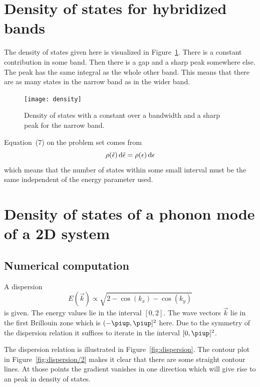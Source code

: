 \documentclass[11pt, english, fleqn, DIV=15, headinclude, BCOR=1cm]{scrartcl}
\begin{document}
\section{Density of states for hybridized bands}
\label{homework:2}

The density of states given here is visualized in Figure~\ref{fig:density}.
There is a constant contribution in some band. Then there is a gap and a sharp
peak somewhere else. The peak has the same integral as the whole other band.
This means that there are as many states in the narrow band as in the wider
band.

\begin{figure}
    \centering
    \texttt{[image: density]}
    \caption{%
        Density of states with a constant over a bandwidth and a sharp peak for
        the narrow band.
    }
    \label{fig:density}
\end{figure}

Equation~(7) on the problem set comes from
\[
    \rho(\tilde\epsilon) \mathop{}\!\mathrm d \tilde\epsilon = \rho(\epsilon) \mathop{}\!\mathrm d \epsilon
\]
which means that the number of states within some small interval must be the
same independent of the energy parameter used.

\section{Density of states of a phonon mode of a 2D system}
\label{homework:3}

\subsection{Numerical computation}

A dispersion
\[
    E(\vec k) \propto \sqrt{2 - \cos(k_x) - \cos(k_y)}
\]
is given. The energy values lie in the interval $[0, 2]$. The wave vectors
$\vec k$ lie in the first Brillouin zone which is $(-\piup, \piup]^2$ here. Due
to the symmetry of the dispersion relation it suffices to iterate in the
interval $[0, \piup]^2$.

The dispersion relation is illustrated in Figure~\ref{fig:dispersion}. The
contour plot in Figure~\ref{fig:dispersion/2} makes it clear that there are
some straight contour lines. At those points the gradient vanishes in one
direction which will give rise to an peak in density of states.
\end{document}
